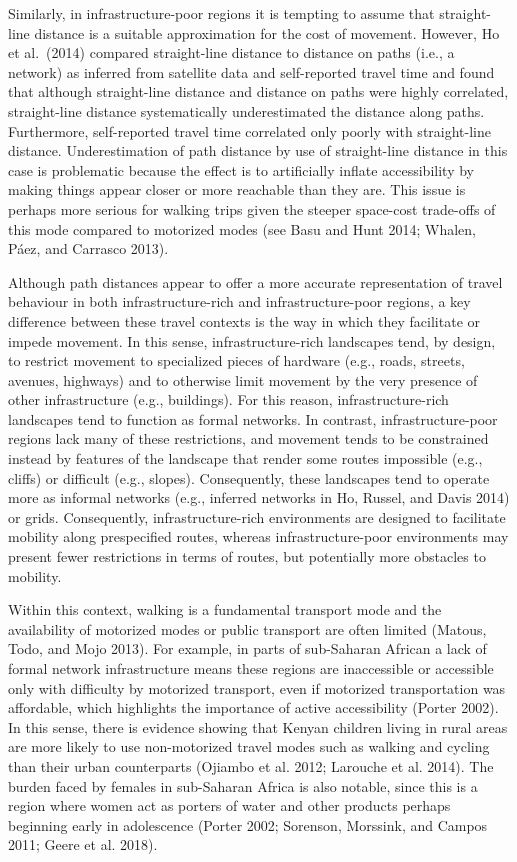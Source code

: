 \documentclass[]{elsarticle} %
\begin{document}
Similarly, in infrastructure-poor regions it is tempting to assume that
straight-line distance is a suitable approximation for the cost of
movement. However, Ho et al.~(2014) compared straight-line distance to
distance on paths (i.e., a network) as inferred from satellite data and
self-reported travel time and found that although straight-line distance
and distance on paths were highly correlated, straight-line distance
systematically underestimated the distance along paths. Furthermore,
self-reported travel time correlated only poorly with straight-line
distance. Underestimation of path distance by use of straight-line
distance in this case is problematic because the effect is to
artificially inflate accessibility by making things appear closer or
more reachable than they are. This issue is perhaps more serious for
walking trips given the steeper space-cost trade-offs of this mode
compared to motorized modes (see Basu and Hunt 2014; Whalen, Páez, and
Carrasco 2013).

Although path distances appear to offer a more accurate representation
of travel behaviour in both infrastructure-rich and infrastructure-poor
regions, a key difference between these travel contexts is the way in
which they facilitate or impede movement. In this sense,
infrastructure-rich landscapes tend, by design, to restrict movement to
specialized pieces of hardware (e.g., roads, streets, avenues, highways)
and to otherwise limit movement by the very presence of other
infrastructure (e.g., buildings). For this reason, infrastructure-rich
landscapes tend to function as formal networks. In contrast,
infrastructure-poor regions lack many of these restrictions, and
movement tends to be constrained instead by features of the landscape
that render some routes impossible (e.g., cliffs) or difficult (e.g.,
slopes). Consequently, these landscapes tend to operate more as informal
networks (e.g., inferred networks in Ho, Russel, and Davis 2014) or
grids. Consequently, infrastructure-rich environments are designed to
facilitate mobility along prespecified routes, whereas
infrastructure-poor environments may present fewer restrictions in terms
of routes, but potentially more obstacles to mobility.

Within this context, walking is a fundamental transport mode and the
availability of motorized modes or public transport are often limited
(Matous, Todo, and Mojo 2013). For example, in parts of sub-Saharan
African a lack of formal network infrastructure means these regions are
inaccessible or accessible only with difficulty by motorized transport,
even if motorized transportation was affordable, which highlights the
importance of active accessibility (Porter 2002). In this sense, there
is evidence showing that Kenyan children living in rural areas are more
likely to use non-motorized travel modes such as walking and cycling
than their urban counterparts (Ojiambo et al. 2012; Larouche et al.
2014). The burden faced by females in sub-Saharan Africa is also
notable, since this is a region where women act as porters of water and
other products perhaps beginning early in adolescence (Porter 2002;
Sorenson, Morssink, and Campos 2011; Geere et al. 2018).
\end{document}
